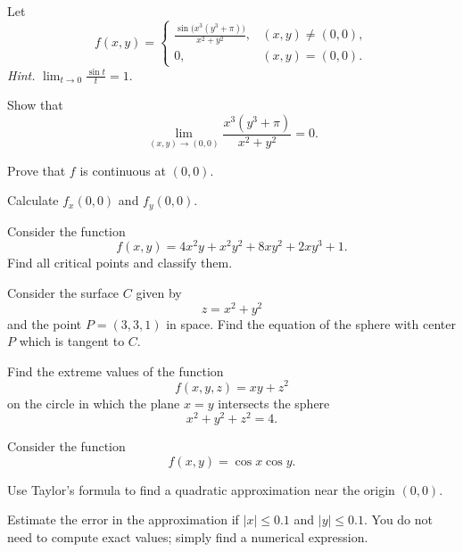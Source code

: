 \begin{problem}
Let
\[
f(x,y)=
\begin{cases}
\displaystyle\frac{\sin\!\bigl(x^3(y^3+\pi)\bigr)}{x^2+y^2}, & (x,y)\ne(0,0),\\[0.6em]
0, & (x,y)=(0,0).
\end{cases}
\]
\textit{Hint.} $\displaystyle\lim_{t\to0}\frac{\sin t}{t}=1$.
\begin{problemsubparts}
\item Show that
\[
\lim_{(x,y)\to(0,0)}\frac{x^3(y^3+\pi)}{x^2+y^2}=0.
\]
\item Prove that $f$ is continuous at $(0,0)$.
\item Calculate $f_x(0,0)$ and $f_y(0,0)$.
\end{problemsubparts}
\end{problem}

\begin{problem}
Consider the function
\[
f(x,y)=4x^2y+x^2y^2+8xy^2+2xy^3+1.
\]
Find all critical points and classify them.
\end{problem}

\begin{problem}
Consider the surface $C$ given by
\[
z=x^2+y^2
\]
and the point $P=(3,3,1)$ in space. Find the equation of the sphere with center $P$ which is tangent to $C$.
\end{problem}

\begin{problem}
Find the extreme values of the function
\[
f(x,y,z)=xy+z^2
\]
on the circle in which the plane $x=y$ intersects the sphere
\[
x^2+y^2+z^2=4.
\]
\end{problem}

\begin{problem}
Consider the function
\[
f(x,y)=\cos x\cos y.
\]
\begin{problemsubparts}
\item Use Taylor's formula to find a quadratic approximation near the origin $(0,0)$.
\item Estimate the error in the approximation if $|x|\le0.1$ and $|y|\le0.1$. You do not need to compute exact values; simply find a numerical expression.
\end{problemsubparts}
\end{problem}

